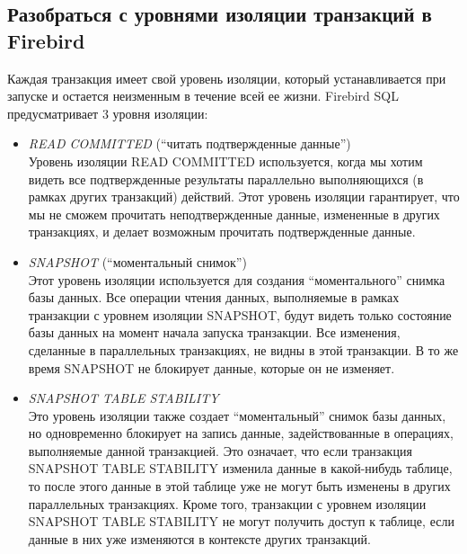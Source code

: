 

\subsection{Разобраться с уровнями изоляции транзакций в Firebird}

Каждая транзакция имеет свой уровень изоляции, который устанавливается при запуске и остается неизменным в течение всей ее жизни. Firebird SQL предусматривает 3 уровня изоляции:

\begin{itemize}
	\item \emph{READ COMMITTED} ("`читать подтвержденные данные"') \\

	Уровень изоляции READ COMMITTED используется, когда мы хотим видеть все подтвержденные результаты параллельно выполняющихся (в рамках других транзакций) действий. Этот уровень изоляции гарантирует, что мы не сможем прочитать неподтвержденные данные, измененные в других транзакциях, и делает возможным прочитать подтвержденные данные. \\

	\item \emph{SNAPSHOT} ("`моментальный снимок"') \\

	Этот уровень изоляции используется для создания "`моментального"' снимка базы  данных. Все операции чтения данных, выполняемые в рамках транзакции с уровнем изоляции SNAPSHOT, будут видеть только состояние базы данных на момент начала запуска транзакции. Все изменения, сделанные в параллельных транзакциях, не видны в этой транзакции. В то же время SNAPSHOT не блокирует данные, которые он не изменяет. \\

	\item \emph{SNAPSHOT TABLE STABILITY} \\

	Это уровень изоляции также создает "`моментальный"' снимок базы данных, но одновременно блокирует на запись данные, задействованные в операциях, выполняемые данной транзакцией. Это означает, что если транзакция SNAPSHOT TABLE STABILITY изменила данные в какой-нибудь таблице, то после этого данные в этой таблице уже не могут быть изменены в других параллельных транзакциях. Кроме того, транзакции с уровнем изоляции SNAPSHOT TABLE STABILITY не могут получить доступ к таблице, если данные в них уже изменяются в контексте других транзакций.
\end{itemize} 


